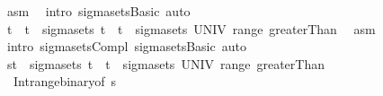 \begin{isabellebody}
\ asm\ \isamarkupfalse%
\ {\isacharparenleft}{\kern0pt}intro\ sigma{\isacharunderscore}{\kern0pt}sets{\isachardot}{\kern0pt}Basic{\isacharparenright}{\kern0pt}\ auto\isanewline
\ \ \ \ \ \ \isamarkupfalse%
\ \isamarkupfalse%
\ {\isachardoublequoteopen}{\isacharbraceleft}{\kern0pt}t\ {\isacharminus}{\kern0pt}\ {\isacharbraceleft}{\kern0pt}t{\isacharless}{\kern0pt}{\isachardot}{\kern0pt}{\isachardot}{\kern0pt}{\isacharbraceright}{\kern0pt}\ {\isasymin}\ sigma{\isacharunderscore}{\kern0pt}sets\ {\isacharbraceleft}{\kern0pt}t\ {\isacharparenleft}{\kern0pt}{\isacharparenleft}{\kern0pt}{\isasyminter}{\isacharparenright}{\kern0pt}\ {\isacharbraceleft}{\kern0pt}t\ {\isacharbackquote}{\kern0pt}\ sigma{\isacharunderscore}{\kern0pt}sets\ UNIV\ {\isacharparenleft}{\kern0pt}range\ greaterThan{\isacharparenright}{\kern0pt}{\isacharparenright}{\kern0pt}{\isachardoublequoteclose}\ \isamarkupfalse%
\ asm\ \isamarkupfalse%
\ {\isacharparenleft}{\kern0pt}intro\ sigma{\isacharunderscore}{\kern0pt}sets{\isachardot}{\kern0pt}Compl\ sigma{\isacharunderscore}{\kern0pt}sets{\isachardot}{\kern0pt}Basic{\isacharparenright}{\kern0pt}\ auto\isanewline
\ \ \ \ \ \ \isamarkupfalse%
\ \isamarkupfalse%
\ {\isachardoublequoteopen}{\isacharbraceleft}{\kern0pt}s{\isacharless}{\kern0pt}{\isachardot}{\kern0pt}{\isachardot}{\kern0pt}t{\isacharbraceright}{\kern0pt}\ {\isasymin}\ sigma{\isacharunderscore}{\kern0pt}sets\ {\isacharbraceleft}{\kern0pt}t\ {\isacharparenleft}{\kern0pt}{\isacharparenleft}{\kern0pt}{\isasyminter}{\isacharparenright}{\kern0pt}\ {\isacharbraceleft}{\kern0pt}t\ {\isacharbackquote}{\kern0pt}\ sigma{\isacharunderscore}{\kern0pt}sets\ UNIV\ {\isacharparenleft}{\kern0pt}range\ greaterThan{\isacharparenright}{\kern0pt}{\isacharparenright}{\kern0pt}{\isachardoublequoteclose}\ \isamarkupfalse%
\ {\isacharasterisk}{\kern0pt}\ Int{\isacharunderscore}{\kern0pt}range{\isacharunderscore}{\kern0pt}binary{\isacharbrackleft}{\kern0pt}of\ {\isachardoublequoteopen}{\isacharbraceleft}{\kern0pt}s{\isacharless}{\kern0pt}{\isachardot}{\kern0pt}{\isachardot}{\kern0pt}{\isacharbraceright}{\kern0pt}{\isachardoublequoteclose}{\isacharbrackright}{\kern0pt}\ \isamarkupfalse%

\end{isabellebody}
